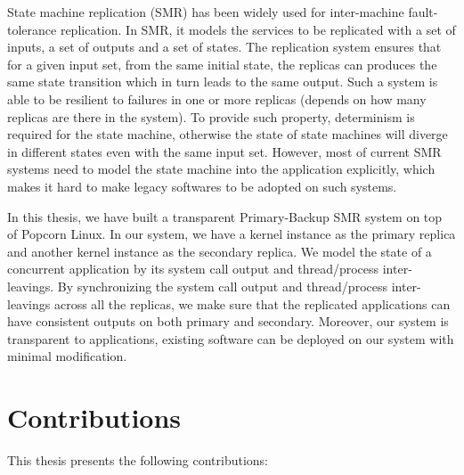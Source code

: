State machine replication (SMR) has been widely used for inter-machine fault-tolerance replication. In SMR, it models the services to be replicated with a set of inputs, a set of outputs and a set of states. The replication system ensures that for a given input set, from the same initial state, the replicas can produces the same state transition which in turn leads to the same output. Such a system is able to be resilient to failures in one or more replicas (depends on how many replicas are there in the system). To provide such property, determinism is required for the state machine, otherwise the state of state machines will diverge in different states even with the same input set. However, most of current SMR systems need to model the state machine into the application explicitly, which makes it hard to make legacy softwares to be adopted on such systems. 


In this thesis, we have built a transparent Primary-Backup SMR system on top of Popcorn Linux. In our system, we have a kernel instance as the primary replica and another kernel instance as the secondary replica. We model the state of a concurrent application by its system call output and thread/process inter-leavings. By synchronizing the system call output and thread/process inter-leavings across all the replicas, we  make sure that the replicated applications can have consistent outputs on both primary and secondary. Moreover, our system is transparent to applications, existing software can be deployed on our system with minimal modification.


\section{Contributions}

This thesis presents the following contributions:

